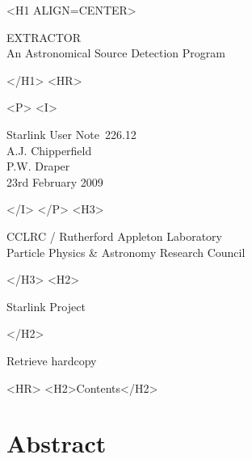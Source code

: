 \documentclass[twoside,11pt]{article}
\newcommand{\stardoccategory}  {Starlink User Note}
\newcommand{\stardocsource}    {sun\stardocnumber}
\newcommand{\stardocnumber}    {226.12}
\newcommand{\stardocauthors}   {A.J. Chipperfield\\
                                P.W. Draper}
\newcommand{\stardocdate}      {23rd February 2009}
\newcommand{\stardoctitle}     {EXTRACTOR\\
                                An Astronomical Source Detection Program}
\newcommand{\htmladdnormallink}[2]{#1}
\newcommand{\htmladdimg}[1]{}
\newcommand{\htmlref}[2]{#1}
\newcommand{\htmladdtonavigation}[1]{}
\newcommand{\xlabel}[1]{}
\renewcommand{\_}{\texttt{\symbol{95}}}
\begin{document}
\begin{htmlonly}
   \xlabel{}
   \begin{rawhtml} <H1 ALIGN=CENTER> \end{rawhtml}
      \stardoctitle
   \begin{rawhtml} </H1> <HR> \end{rawhtml}

   \begin{center}
     \htmladdimg{sun226fig.gif}
   \end{center}

   \begin{rawhtml} <P> <I> \end{rawhtml}
   \stardoccategory\ \stardocnumber \\
   \stardocauthors \\
   \stardocdate
   \begin{rawhtml} </I> </P> <H3> \end{rawhtml}
      \htmladdnormallink{CCLRC / Rutherford Appleton Laboratory}
                        {http://www.cclrc.ac.uk}\\
      \htmladdnormallink{Particle Physics \& Astronomy Research Council}
                        {http://www.pparc.ac.uk} \\
   \begin{rawhtml} </H3> <H2> \end{rawhtml}
      \htmladdnormallink{Starlink Project}{http://www.starlink.ac.uk/}
   \begin{rawhtml} </H2> \end{rawhtml}
   \htmladdnormallink{\htmladdimg{source.gif} Retrieve hardcopy}
      {http://www.starlink.ac.uk/cgi-bin/hcserver?\stardocsource}\\

  \label{stardoccontents}
  \begin{rawhtml}
    <HR>
    <H2>Contents</H2>
  \end{rawhtml}
  \htmladdtonavigation{\htmlref{\htmladdimg{contents_motif.gif}}
        {stardoccontents}}

  \section{\xlabel{abstract}Abstract}
\end{htmlonly}
\end{document}
